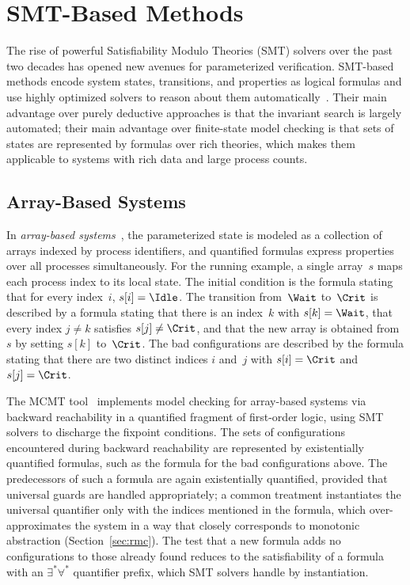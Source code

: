 \section{SMT-Based Methods}
\label{sec:smt}

The rise of powerful Satisfiability Modulo Theories (SMT) solvers over the
past two decades has opened new avenues for parameterized verification.
SMT-based methods encode system states, transitions, and properties as logical
formulas and use highly optimized solvers to reason about them
automatically~\cite{BSST09}. Their main advantage over purely deductive
approaches is that the invariant search is largely automated; their main
advantage over finite-state model checking is that sets of states are
represented by formulas over rich theories, which makes them applicable to
systems with rich data and large process counts.

\subsection{Array-Based Systems}

In \emph{array-based systems}~\cite{GR10,GS10}, the parameterized state is
modeled as a collection of arrays indexed by process identifiers, and
quantified formulas express properties over all processes simultaneously. For
the running example, a single array~$s$ maps each process index to its local
state. The initial condition is the formula stating that for every index~$i$,
$s[i] = \Idle$. The transition from~$\Wait$ to~$\Crit$ is described by a
formula stating that there is an index~$k$ with $s[k] = \Wait$, that every
index $j \neq k$ satisfies $s[j] \neq \Crit$, and that the new array is
obtained from~$s$ by setting $s[k]$ to~$\Crit$. The bad configurations are
described by the formula stating that there are two distinct indices $i$
and~$j$ with $s[i] = \Crit$ and $s[j] = \Crit$.

The MCMT tool~\cite{GS10} implements model checking for array-based systems
via backward reachability in a quantified fragment of first-order logic, using
SMT solvers to discharge the fixpoint conditions. The sets of configurations
encountered during backward reachability are represented by existentially
quantified formulas, such as the formula for the bad configurations above. The
predecessors of such a formula are again existentially quantified, provided
that universal guards are handled appropriately; a common treatment
instantiates the universal quantifier only with the indices mentioned in the
formula, which over-approximates the system in a way that closely corresponds
to monotonic abstraction (Section~\ref{sec:rmc}). The test that a new formula
adds no configurations to those already found reduces to the satisfiability of
a formula with an $\exists^*\forall^*$ quantifier prefix, which SMT solvers
handle by instantiation.

